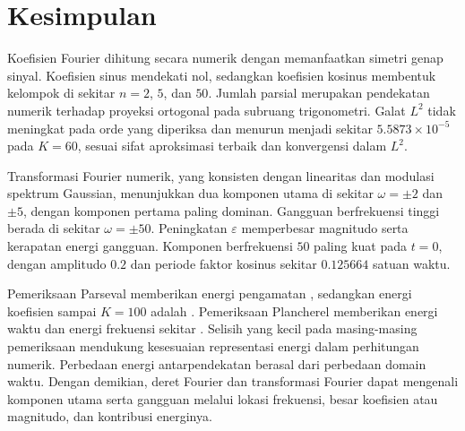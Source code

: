 \documentclass[11pt,a4paper]{article}
\begin{document}
\section{Kesimpulan}
Koefisien Fourier dihitung secara numerik dengan memanfaatkan simetri
genap sinyal. Koefisien sinus mendekati nol, sedangkan koefisien kosinus
membentuk kelompok di sekitar $n=2$, $5$, dan $50$. Jumlah parsial
merupakan pendekatan numerik terhadap proyeksi ortogonal pada subruang
trigonometri. Galat $L^2$ tidak meningkat pada orde yang diperiksa dan
menurun menjadi sekitar $5.5873\times10^{-5}$ pada $K=60$, sesuai
sifat aproksimasi terbaik dan konvergensi dalam $L^2$.

Transformasi Fourier numerik, yang konsisten dengan linearitas dan
modulasi spektrum Gaussian, menunjukkan dua komponen utama di sekitar
$\omega=\pm2$ dan $\pm5$, dengan komponen pertama paling dominan.
Gangguan berfrekuensi tinggi berada di sekitar $\omega=\pm50$.
Peningkatan $\varepsilon$ memperbesar magnitudo serta kerapatan energi
gangguan. Komponen berfrekuensi $50$ paling kuat pada $t=0$, dengan
amplitudo $0.2$ dan periode faktor kosinus sekitar $0.125664$ satuan waktu.

Pemeriksaan Parseval memberikan energi pengamatan \EnergiInterval,
sedangkan energi koefisien sampai $K=100$ adalah \EnergiParseval.
Pemeriksaan Plancherel memberikan energi waktu dan energi frekuensi
sekitar \EnergiWaktu. Selisih yang kecil pada masing-masing pemeriksaan
mendukung kesesuaian representasi energi dalam perhitungan numerik.
Perbedaan energi antarpendekatan berasal dari perbedaan domain waktu.
Dengan demikian, deret Fourier dan transformasi Fourier dapat mengenali
komponen utama serta gangguan melalui lokasi frekuensi, besar koefisien
atau magnitudo, dan kontribusi energinya.



\end{document}
